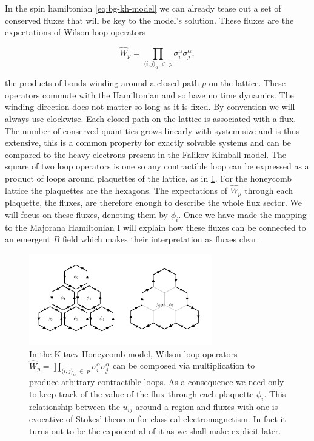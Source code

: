 In the spin hamiltonian \cref{eq:bg-kh-model} we can already tease out a set of conserved fluxes that will be key to the model's solution. These fluxes are the expectations of Wilson loop operators

\[\hat{W}_p = \prod_{\langle i,j\rangle_\alpha\; \in\; p} \sigma_i^{\alpha}\sigma_j^{\alpha},\]

the products of bonds winding around a closed path \(p\) on the lattice. These operators commute with the Hamiltonian and so have no time dynamics. The winding direction does not matter so long as it is fixed. By convention we will always use clockwise. Each closed path on the lattice is associated with a flux. The number of conserved quantities grows linearly with system size and is thus extensive, this is a common property for exactly solvable systems and can be compared to the heavy electrons present in the Falikov-Kimball model. The square of two loop operators is one so any contractible loop can be expressed as a product of loops around plaquettes of the lattice, as in \cref{fig:stokes_theorem}. For the honeycomb lattice the plaquettes are the hexagons. The expectations of \(\hat{W}_p\) through each plaquette, the fluxes, are therefore enough to describe the whole flux sector. We will focus on these fluxes, denoting them by \(\phi_i\). Once we have made the mapping to the Majorana Hamiltonian I will explain how these fluxes can be connected to an emergent \(B\) field which makes their interpretation as fluxes clear.

\hypertarget{fig:stokes_theorem}{%
\begin{figure}
\centering
\includegraphics[width=0.71\textwidth,height=\textheight]{figure_code/amk_chapter/stokes_theorem/stokes_theorem}
\caption[{We can construct arbitrary loops from plaquette fluxes.}]{In the Kitaev Honeycomb model, Wilson loop operators \(\hat{W}_p = \prod_{\langle i,j\rangle_\alpha\; \in\; p} \sigma_i^{\alpha}\sigma_j^{\alpha}\) can be composed via multiplication to produce arbitrary contractible loops. As a consequence we need only to keep track of the value of the flux through each plaquette \(\phi_i\). This relationship between the \(u_{ij}\) around a region and fluxes with one is evocative of Stokes' theorem for classical electromagnetism. In fact it turns out to be the exponential of it as we shall make explicit later.}
\label{fig:stokes_theorem}
\end{figure}
}

